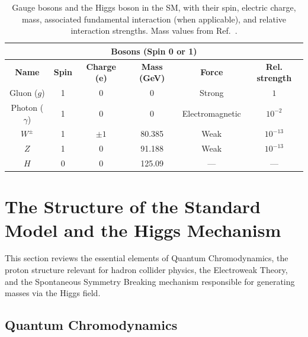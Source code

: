 \begin{table}[htbp]
\centering
\caption{Gauge bosons and the Higgs boson in the SM, with their spin, electric charge, mass, associated fundamental interaction (when applicable), and relative interaction strengths. Mass values from Ref.~\cite{ParticleDataGroup}.}
\small
\renewcommand{\arraystretch}{1.2}
\setlength{\tabcolsep}{6pt}
\begin{tabular}{cccccc}
\multicolumn{6}{c}{\textbf{Bosons (Spin 0 or 1)}} \\
\toprule
\textbf{Name} & \textbf{Spin} & \textbf{Charge (e)} & \textbf{Mass (GeV)} & \textbf{Force} & \textbf{Rel. strength} \\
\midrule
Gluon ($g$)     & 1 & 0        & 0       & Strong         & $1$ \\
Photon ($\gamma$) & 1 & 0        & 0       & Electromagnetic & $10^{-2}$ \\
$W^{\pm}$       & 1 & $\pm 1$  & 80.385  & Weak           & $10^{-13}$ \\
$Z$             & 1 & 0        & 91.188  & Weak           & $10^{-13}$ \\
$H$             & 0 & 0        & 125.09  & —              & — \\
\bottomrule
\end{tabular}
\label{tab:bosons}
\end{table}



\section{The Structure of the Standard Model and the Higgs Mechanism}
\label{sec:sm_higgs_mech}


This section reviews the essential elements of Quantum Chromodynamics, the proton structure relevant for hadron collider physics, the Electroweak Theory, and the Spontaneous Symmetry Breaking mechanism responsible for generating masses via the Higgs field.


\subsection{Quantum Chromodynamics}
\label{subsec:QCD}

